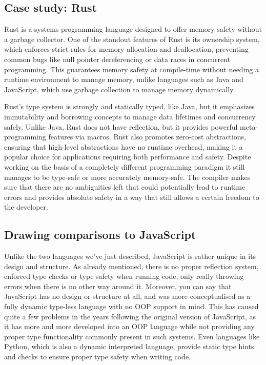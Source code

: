 \subsection{Case study: Rust}

Rust is a systems programming language designed to offer memory safety without a garbage collector. One of the standout features of Rust is its ownership system, which enforces strict rules for memory allocation and deallocation, preventing common bugs like null pointer dereferencing or data races in concurrent programming. This guarantees memory safety at compile-time without needing a runtime environment to manage memory, unlike languages such as Java and JavaScript, which use garbage collection to manage memory dynamically.

Rust's type system is strongly and statically typed, like Java, but it emphasizes immutability and borrowing concepts to manage data lifetimes and concurrency safely. Unlike Java, Rust does not have reflection, but it provides powerful meta-programming features via macros. Rust also promotes zero-cost abstractions, ensuring that high-level abstractions have no runtime overhead, making it a popular choice for applications requiring both performance and safety. Despite working on the basis of a completely different programming paradigm it still manages to be type-safe or more accurately memory-safe. The compiler makes sure that there are no ambiguities left that could potentially lead to runtime errors and provides absolute safety in a way that still allows a certain freedom to the developer.

\subsection{Drawing comparisons to JavaScript}

Unlike the two languages we've just described, JavaScript is rather unique in its design and structure. As already mentioned, there is no proper reflection system, enforced type checks or type safety when running code, only really throwing errors when there is no other way around it. Moreover, you can say that JavaScript has no design or structure at all, and was more conceptualised as a fully dynamic type-less language with no OOP support in mind. This has caused quite a few problems in the years following the original version of JavaScript, as it has more and more developed into an OOP language while not providing any proper type functionality commonly present in such systems. Even languages like Python, which is also a dynamic interpreted language, provide static type hints and checks to ensure proper type safety when writing code.

